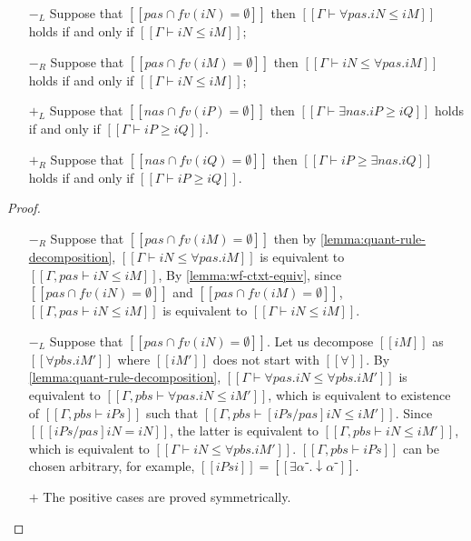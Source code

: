 \begin{corollary}
  \label{corollary:red-quant-elim}
  \hfill
  \begin{itemize}
    \item [$-_{L}$] Suppose that $[[ {pas} ∩ fv(iN) = ∅]]$ then 
      $[[Γ ⊢ ∀pas.iN ≤ iM]]$ holds if and only if $[[Γ ⊢ iN ≤ iM]]$;
    \item [$-_{R}$] Suppose that $[[ {pas} ∩ fv(iM) = ∅]]$ then 
      $[[Γ ⊢ iN ≤ ∀pas.iM]]$ holds if and only if $[[Γ ⊢ iN ≤ iM]]$;
    \item [$+_{L}$] Suppose that $[[ {nas} ∩ fv(iP) = ∅]]$ then
      $[[Γ ⊢ ∃nas.iP ≥ iQ]]$ holds if and only if $[[Γ ⊢ iP ≥ iQ]]$.
    \item [$+_{R}$] Suppose that $[[ {nas} ∩ fv(iQ) = ∅]]$ then 
      $[[Γ ⊢ iP ≥ ∃nas.iQ]]$ holds if and only if $[[Γ ⊢ iP ≥ iQ]]$.
  \end{itemize}
\end{corollary}
\begin{proof}
  \begin{itemize}
    \item [$-_{R}$] Suppose that $[[ {pas} ∩ fv(iM) = ∅]]$ then 
      by \cref{lemma:quant-rule-decomposition},
      $[[Γ ⊢ iN ≤ ∀pas.iM]]$ 
      is equivalent to $[[Γ, pas ⊢ iN ≤ iM]]$,
      By \cref{lemma:wf-ctxt-equiv},
      since $[[{pas} ∩ fv(iN) = ∅]]$ and $[[{pas} ∩ fv(iM) = ∅]]$,
      $[[Γ, pas ⊢ iN ≤ iM]]$ is equivalent to $[[Γ ⊢ iN ≤ iM]]$.

    \item [$-_{L}$] Suppose that $[[ {pas} ∩ fv(iN) = ∅]]$.
      Let us decompose $[[iM]]$ as $[[∀pbs.iM']]$ 
      where $[[iM']]$ does not start with $[[∀]]$.
      By \cref{lemma:quant-rule-decomposition},
      $[[Γ ⊢ ∀pas.iN ≤ ∀pbs.iM']]$ is equivalent to
      $[[Γ,pbs ⊢ ∀pas.iN ≤ iM']]$, 
      which is equivalent to 
      existence of $[[Γ,pbs ⊢ iPs]]$ such that 
      $[[Γ,pbs ⊢ [iPs/pas]iN ≤ iM']]$.
      Since $[[ [iPs/pas]iN  = iN]]$, the latter is equivalent to 
      $[[Γ,pbs ⊢ iN ≤ iM']]$,
      which is equivalent to $[[Γ ⊢ iN ≤ ∀pbs.iM']]$.
      $[[Γ,pbs ⊢ iPs]]$ can be chosen arbitrary, for example, $[[iPsi]] = [[∃α⁻.↓α⁻]]$.
    \item [$+$] The positive cases are proved symmetrically.
  \end{itemize}
\end{proof}

